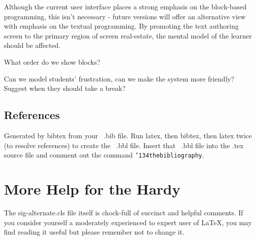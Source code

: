 \documentclass{sig-alternate}
\begin{document}
Although the current user interface places a strong emphasis on the block-based programming, this isn't necessary - future versions will offer an alternative view with emphasis on the textual programming. By promoting the text authoring screen to the primary region of screen real-estate, the mental model of the learner should be affected.

What order do we show blocks?

Can we model students' frustration, can we make the system more friendly? Suggest when they should take a break?


%

%
%
\appendix
\subsection{References}
Generated by bibtex from your ~.bib file.  Run latex,
then bibtex, then latex twice (to resolve references)
to create the ~.bbl file.  Insert that ~.bbl file into
the .tex source file and comment out
the command \texttt{{\char'134}thebibliography}.
\section{More Help for the Hardy}
The sig-alternate.cls file itself is chock-full of succinct
and helpful comments.  If you consider yourself a moderately
experienced to expert user of \LaTeX, you may find reading
it useful but please remember not to change it.
\end{document}
